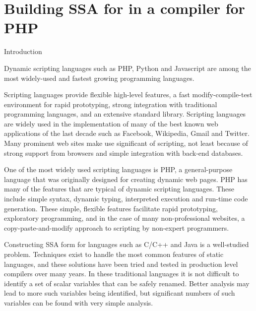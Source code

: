 \chapter{Building SSA for in a compiler for PHP\\ }

\providecommand{\phc}{PHC}
\providecommand{\php}[1]{\textsf{#1}}
\providecommand{\pbterm}[1]{\textsf{#1}}
\providecommand{\chref}[1]{Chapter~#1}
\providecommand{\secref}[1]{Chapter~#1}
\providecommand{\figref}[1]{Figure~#1}
\providecommand{\var}[1]{$\$#1$}
\providecommand{\comnt}[1]

\section{Introduction}

Dynamic scripting languages such as PHP, Python and Javascript are
among the most widely-used and fastest growing programming languages.

Scripting languages provide flexible high-level features, a fast
modify-compile-test environment for rapid prototyping, strong
integration with traditional programming languages, and an extensive
standard library.  Scripting languages are widely used in the
implementation of many of the best known web applications of the last
decade such as Facebook, Wikipedia, Gmail and Twitter.  Many prominent
web sites make use significant of scripting, not least because of
strong support from browsers and simple integration with back-end
databases.

One of the most widely used scripting languages is PHP, a
general-purpose language that was originally designed for creating
dynamic web pages.  PHP has many of the features that are typical of
dynamic scripting languages.  These include simple syntax, dynamic
typing, interpreted execution and run-time code generation.  These
simple, flexible features facilitate rapid prototyping, exploratory
programming, and in the case of many non-professional websites, a
copy-paste-and-modify approach to scripting by non-expert programmers.

Constructing SSA form for languages such as C/C++ and Java is a
well-studied problem. Techniques exist to handle the most common
features of static languages, and these solutions have been tried and
tested in production level compilers over many years.  In these
traditional languages it is not difficult to identify a set of scalar
variables that can be safely renamed.  Better analysis may lead to
more such variables being identified, but significant numbers of such
variables can be found with very simple analysis.

